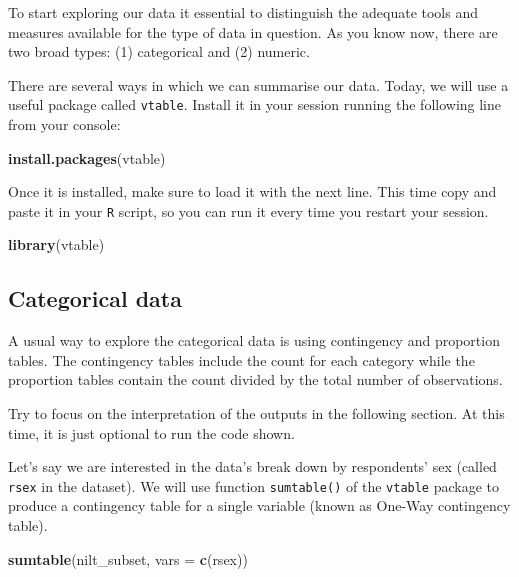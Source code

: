 \documentclass[
]{book}
\newenvironment{Shaded}{\begin{snugshade}}{\end{snugshade}}
\newcommand{\AttributeTok}[1]{\textcolor[rgb]{0.13,0.29,0.53}{#1}}
\newcommand{\FunctionTok}[1]{\textcolor[rgb]{0.13,0.29,0.53}{\textbf{#1}}}
\newcommand{\NormalTok}[1]{#1}
\newcommand{\StringTok}[1]{\textcolor[rgb]{0.31,0.60,0.02}{#1}}
\begin{document}
To start exploring our data it essential to distinguish the adequate tools and measures available for the type of data in question. As you know now, there are two broad types: (1) categorical and (2) numeric.

There are several ways in which we can summarise our data. Today, we will use a useful package called \texttt{vtable}. Install it in your session running the following line from your console:

\begin{Shaded}
\begin{Highlighting}[]
\FunctionTok{install.packages}\NormalTok{(}\StringTok{\textquotesingle{}vtable\textquotesingle{}}\NormalTok{)}
\end{Highlighting}
\end{Shaded}

Once it is installed, make sure to load it with the next line. This time copy and paste it in your \texttt{R} script, so you can run it every time you restart your session.

\begin{Shaded}
\begin{Highlighting}[]
\FunctionTok{library}\NormalTok{(vtable)}
\end{Highlighting}
\end{Shaded}

\hypertarget{categorical-data}{%
\subsection{Categorical data}\label{categorical-data}}

A usual way to explore the categorical data is using contingency and proportion tables. The contingency tables include the count for each category while the proportion tables contain the count divided by the total number of observations.

Try to focus on the interpretation of the outputs in the following section. At this time, it is just optional to run the code shown.

Let's say we are interested in the data's break down by respondents' sex (called \texttt{rsex} in the dataset). We will use function \texttt{sumtable()} of the \texttt{vtable} package to produce a contingency table for a single variable (known as One-Way contingency table).

\begin{Shaded}
\begin{Highlighting}[]
\FunctionTok{sumtable}\NormalTok{(nilt\_subset, }\AttributeTok{vars =} \FunctionTok{c}\NormalTok{(}\StringTok{\textquotesingle{}rsex\textquotesingle{}}\NormalTok{))}
\end{Highlighting}
\end{Shaded}
\end{document}
